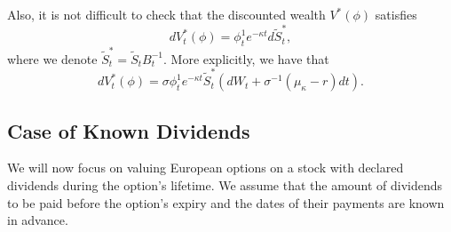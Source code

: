Also, it is not difficult to check that the discounted wealth $V^*(\phi)$ satisfies
\begin{equation}
	dV^*_t(\phi) = \phi^1_t e^{-\kappa t} d\tilde{S}^*_t,
	\label{eq:DiscountedWealthSimple}
\end{equation}
where we denote $\tilde{S}^*_t = \tilde{S}_t B_t^{-1}$. More explicitly, we have that
\begin{equation}
	dV^*_t(\phi) = \sigma \phi^1_t e^{-\kappa t} \tilde{S}^*_t (dW_t + \sigma^{-1}(\mu_\kappa - r)dt).
	\label{eq:DiscountedWealthExplicit}
\end{equation}

\subsection{Case of Known Dividends}
We will now focus on valuing European options on a stock with declared dividends during the option’s lifetime. We assume that the amount of dividends to be paid before the option’s expiry and the dates of their payments are known in advance.


